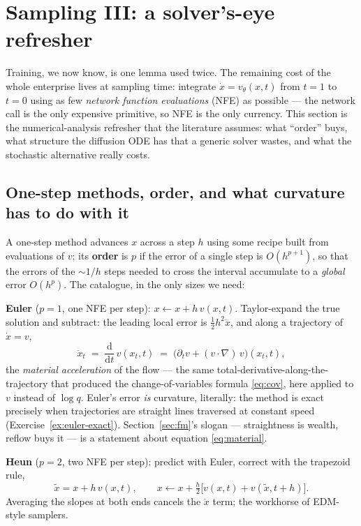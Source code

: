 \documentclass[10pt,a4paper]{article}
\newcommand{\dd}{\mathrm{d}}
\begin{document}
\section{Sampling III: a solver's-eye refresher}
\label{sec:solvers}

Training, we now know, is one lemma used twice. The remaining cost of
the whole enterprise lives at sampling time: integrate
$\dot x = v_\theta(x, t)$ from $t = 1$ to $t = 0$ using as few
\emph{network function evaluations} (NFE) as possible --- the network
call is the only expensive primitive, so NFE is the only currency. This
section is the numerical-analysis refresher that the literature assumes:
what ``order'' buys, what structure the diffusion ODE has that a generic
solver wastes, and what the stochastic alternative really costs.

\subsection{One-step methods, order, and what curvature has to do with it}
\label{sec:order}

A one-step method advances $x$ across a step $h$ using some recipe built
from evaluations of $v$; its \textbf{order} is $p$ if the error of a
single step is $O(h^{p+1})$, so that the errors of the $\sim 1/h$ steps
needed to cross the interval accumulate to a \emph{global} error
$O(h^p)$. The catalogue, in the only sizes we need:

\textbf{Euler} ($p = 1$, one NFE per step): $x \leftarrow x + h\, v(x, t)$.
Taylor-expand the true solution and subtract: the leading local error is
$\tfrac12 h^2 \ddot x$, and along a trajectory of $\dot x = v$,
\begin{equation}
\ddot x_t \;=\; \frac{\dd}{\dd t}\, v(x_t, t)
\;=\; \big( \partial_t v + (v \cdot \nabla)\, v \big)(x_t, t),
\label{eq:material}
\end{equation}
the \emph{material acceleration} of the flow --- the same
total-derivative-along-the-trajectory that produced the
change-of-variables formula \eqref{eq:cov}, here applied to $v$ instead
of $\log q$. Euler's error \emph{is}
curvature, literally: the method is exact precisely when trajectories
are straight lines traversed at constant speed
(Exercise~\ref{ex:euler-exact}). Section~\ref{sec:fm}'s slogan ---
straightness is wealth, reflow buys it --- is a statement about
equation \eqref{eq:material}.

\textbf{Heun} ($p = 2$, two NFE per step): predict with Euler, correct
with the trapezoid rule,
\begin{equation}
\tilde x = x + h\, v(x, t), \qquad
x \leftarrow x + \tfrac{h}{2}\big[ v(x, t) + v(\tilde x, t{+}h) \big].
\end{equation}
Averaging the slopes at both ends cancels the $\ddot x$ term; the
workhorse of EDM-style samplers.
\end{document}
